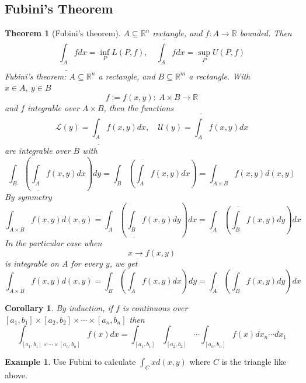 \documentclass[11pt,a4paper]{article}
\theoremstyle{definition}
\newtheorem{example}[definition]{Example}
\theoremstyle{plain}
\newtheorem{theorem}[definition]{Theorem}
\newtheorem{corollary}[definition]{Corollary}
\theoremstyle{remark}
\newcommand{\R}{\mathbb{R}}
\begin{document}
\subsection{Fubini's Theorem} 

\begin{theorem}[Fubini's theorem]
    $A \subseteq \R^n$ rectangle, and $f \colon A \to \R$ bounded. Then 
    $$\underline{\int_A} f dx = \inf_P L(P,f), \quad \overline{\int_A} f dx = \sup_P U(P,f)$$
    Fubini's theorem: $A \subseteq \R^n$ a rectangle, and $B \subseteq \R^m$ a rectangle. With $x\in A, \ y \in B$ 
    $$f := f(x,y) \colon \ A \times B \to \R$$
    and $f$ integrable over $A \times B$, then the functions
    $$\mathcal{L}(y) = \underline{\int_A} f(x,y) dx, \quad \mathcal{U}(y) = \overline{\int_A} f(x,y) dx$$
    are integrable over $B$ with 
    $$\int_B \left(\underline{\int_A}f(x,y) dx\right) dy = \int_B \left(\overline{\int_A}f(x,y) dx\right) = \int_{A \times B} f(x,y) d(x,y)$$
    By symmetry 
    $$\int_{A \times B} f(x,y) d(x,y)= \int_A \left(\underline{\int_B}f(x,y) dy\right) dx = \int_A \left(\overline{\int_B}f(x,y) dy\right) dx$$
    In the particular case when 
    $$x \to f(x,y)$$
    is integrable on $A$ for every $y$, we get 
    $$\int_{A \times B} f(x,y) d(x,y) = \int_B \left(\int_A f(x,y) dx\right) dy = \int_A \left(\int_B f(x,y) dy\right) dx$$
\end{theorem}

\begin{corollary}
    By induction, if $f$ is continuous over $[a_1, b_1] \times [a_2, b_2] \times \cdots \times [a_n, b_n]$ then 
    $$\int_{[a_1, b_1] \times \cdots \times [a_n, b_n]} f(x) dx = \int_{[a_1, b_1]} \int_{[a_2, b_2]} \cdots \int_{[a_n, b_n]} f(x) dx_n \cdots dx_1$$
\end{corollary}

\begin{example}
    Use Fubini to calculate $\int_C x d(x,y)$ where $C$ is the triangle like above. 
\end{example}
\end{document}
